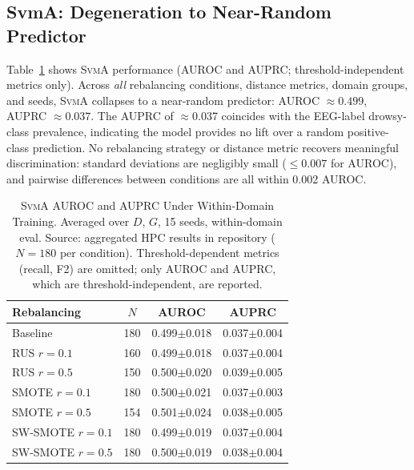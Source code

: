 \documentclass[lettersize,journal]{IEEEtran}
\newcommand{\Impl}[1]{\textsc{#1}}
\begin{document}
\subsection{SvmA: Degeneration to Near-Random Predictor}
\label{sec:svma_results}

Table~\ref{tab:svma_results} shows \Impl{SvmA} performance (AUROC and AUPRC; threshold-independent metrics only).
Across \emph{all} rebalancing conditions, distance metrics, domain groups, and seeds, \Impl{SvmA} collapses to a near-random predictor: AUROC $\approx 0.499$, AUPRC $\approx 0.037$.
The AUPRC of $\approx$0.037 coincides with the EEG-label drowsy-class prevalence, indicating the model provides no lift over a random positive-class prediction.
No rebalancing strategy or distance metric recovers meaningful discrimination: standard deviations are negligibly small ($\leq 0.007$ for AUROC), and pairwise differences between conditions are all within 0.002 AUROC.

\begin{table}[!t]
\caption{\Impl{SvmA} AUROC and AUPRC Under Within-Domain Training. Averaged over $D$, $G$, 15 seeds, within-domain eval. Source: aggregated HPC results in repository ($N{=}180$ per condition). Threshold-dependent metrics (recall, F2) are omitted; only AUROC and AUPRC, which are threshold-independent, are reported.\label{tab:svma_results}}
\centering
\footnotesize
\begin{tabular}{|l|c|c|c|}
\hline
Rebalancing & $N$ & AUROC & AUPRC \\
\hline
Baseline & 180 & 0.499$\pm$0.018 & 0.037$\pm$0.004 \\
\hline
RUS $r\!=\!0.1$ & 160 & 0.499$\pm$0.018 & 0.037$\pm$0.004 \\
RUS $r\!=\!0.5$ & 150 & 0.500$\pm$0.020 & 0.039$\pm$0.005 \\
\hline
SMOTE $r\!=\!0.1$ & 180 & 0.500$\pm$0.021 & 0.037$\pm$0.003 \\
SMOTE $r\!=\!0.5$ & 154 & 0.501$\pm$0.024 & 0.038$\pm$0.005 \\
\hline
SW-SMOTE $r\!=\!0.1$ & 180 & 0.499$\pm$0.019 & 0.037$\pm$0.004 \\
SW-SMOTE $r\!=\!0.5$ & 180 & 0.500$\pm$0.019 & 0.038$\pm$0.004 \\
\hline
\end{tabular}
\end{table}
\end{document}

